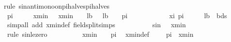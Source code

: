 \begin{isabellebody}
{\isacharparenleft}{\kern0pt}rule\ sin{\isacharunderscore}{\kern0pt}antimono{\isacharunderscore}{\kern0pt}on{\isacharunderscore}{\kern0pt}pi{\isacharunderscore}{\kern0pt}halves{\isacharunderscore}{\kern0pt}{}{\isacharunderscore}{\kern0pt}pi{\isacharunderscore}{\kern0pt}halves{\isacharparenright}{\kern0pt}\isanewline
\ \ \ \ \ \ \isamarkupfalse%
\ {\isachardoublequoteopen}pi\ {\isacharslash}{\kern0pt}\ {}\ {\isasymle}\ {}\ {\isacharslash}{\kern0pt}\ xmin{\isachardoublequoteclose}\ {\isachardoublequoteopen}{}\ {\isacharslash}{\kern0pt}\ xmin\ {\isasymle}\ {}\ {\isacharslash}{\kern0pt}\ lb{\isachardoublequoteclose}\ {\isachardoublequoteopen}{}\ {\isacharslash}{\kern0pt}\ lb\ {\isasymle}\ {}\ {\isacharasterisk}{\kern0pt}\ pi\ {\isacharslash}{\kern0pt}\ {}{\isachardoublequoteclose}\isanewline
\ \ \ \ \ \ \ \ \isamarkupfalse%
\ xi{\isacharparenleft}{\kern0pt}{}{\isacharparenright}{\kern0pt}\ {\isacartoucheopen}pi\ {\isacharless}{\kern0pt}\ {\isasymxi}\ {\isacharasterisk}{\kern0pt}\ {}{\isacartoucheclose}\ {\isacartoucheopen}{}\ {\isacharless}{\kern0pt}lb\ {\isacartoucheclose}\ bds{\isacharparenleft}{\kern0pt}{}{\isacharparenright}{\kern0pt}\ \isamarkupfalse%
\ {\isacharparenleft}{\kern0pt}simp{\isacharunderscore}{\kern0pt}all\ add{\isacharcolon}{\kern0pt}\ xmin{\isacharunderscore}{\kern0pt}def\ field{\isacharunderscore}{\kern0pt}split{\isacharunderscore}{\kern0pt}simps{\isacharparenright}{\kern0pt}\isanewline
\ \ \ \ \isamarkupfalse%
\isanewline
\ \ \ \ \isamarkupfalse%
\ {\isachardoublequoteopen}sin\ {\isacharparenleft}{\kern0pt}{}\ {\isacharslash}{\kern0pt}\ xmin{\isacharparenright}{\kern0pt}\ {\isasymle}\ {}{\isachardoublequoteclose}\isanewline
\ \ \ \ \isamarkupfalse%
\ {\isacharparenleft}{\kern0pt}rule\ sin{\isacharunderscore}{\kern0pt}le{\isacharunderscore}{\kern0pt}zero{\isacharparenright}{\kern0pt}\isanewline
\ \ \ \ \ \ \isamarkupfalse%
\ {\isachardoublequoteopen}{}\ {\isacharslash}{\kern0pt}\ xmin\ {\isacharless}{\kern0pt}\ {}\ {\isacharasterisk}{\kern0pt}\ pi{\isachardoublequoteclose}\ \isamarkupfalse%
\ xmin{\isacharunderscore}{\kern0pt}def\ {\isacartoucheopen}{}\ {\isacharslash}{\kern0pt}\ {\isacharparenleft}{\kern0pt}{}\ {\isacharasterisk}{\kern0pt}\ pi{\isacharparenright}{\kern0pt}\ {\isacharless}{\kern0pt}\ xmin{\isacartoucheclose}\ {\isacartoucheopen}{}\ {\isacharless}{\kern0pt}\ {\isasymxi}{\isacartoucheclose}\isanewline

\end{isabellebody}
